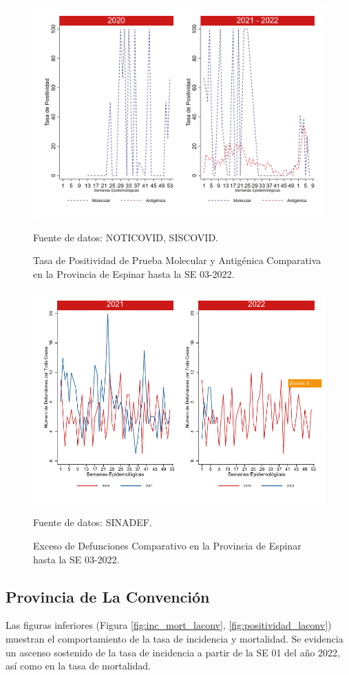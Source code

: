 \documentclass[12pt,a4paper,openany]{book}
\begin{document}
		\begin{figure}[h]
			\caption{Tasa de Positividad de Prueba Molecular y Antigénica Comparativa en la Provincia de Espinar hasta la SE 03-2022.}\label{fig:positividad_espinar}
			\begin{center}
				\includegraphics[width=0.7\linewidth]{../figuras/positividad_20_21_8.png}
			\end{center}
			{\footnotesize {Fuente de datos: NOTICOVID, SISCOVID.}}
		\end{figure}
		
		\begin{figure}[h]
			\caption{Exceso de Defunciones Comparativo en la Provincia de Espinar hasta la SE 03-2022.}\label{fig:exceso_espinar}
			\begin{center}
				\includegraphics[width=0.7\linewidth]{../figuras/exceso_8.pdf}
			\end{center}
			{\footnotesize {Fuente de datos: SINADEF.}}
		\end{figure}
		
		\clearpage
		
		\subsection*{Provincia de La Convención}
		\noindent Las figuras inferiores (Figura \ref{fig:inc_mort_laconv}, \ref{fig:positividad_laconv}) muestran el comportamiento de la tasa de incidencia y mortalidad. Se evidencia un ascenso sostenido de la tasa de incidencia a partir de la SE 01 del año 2022, así como en la tasa de mortalidad. 
\end{document}
